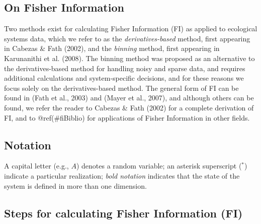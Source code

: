 \documentclass[12pt,twoside,openany]{reedthesis}
\begin{document}
\hypertarget{on-fisher-information}{%
\subsection{On Fisher Information}\label{on-fisher-information}}

Two methods exist for calculating Fisher Information (FI) as applied to ecological systems data, which we refer to as the \emph{derivatives-based} method, first appearing in Cabezas \& Fath (2002), and the \emph{binning} method, first appearing in Karunanithi et al. (2008). The binning method was proposed as an alternative to the derivatives-based method for handling noisy and sparse data, and requires additional calculations and system-specific decisions, and for these reasons we focus solely on the derivatives-based method. The general form of FI can be found in (Fath et al., 2003) and (Mayer et al., 2007), and although others can be found, we refer the reader to Cabezas \& Fath (2002) for a complete derivation of FI, and to @ref(\#fiBiblio) for applications of Fisher Information in other fields.

\hypertarget{notation}{%
\subsection{Notation}\label{notation}}

A capital letter (e.g., \(A\)) denotes a random variable; an asterisk superscript (\(^*\)) indicate a particular realization; \emph{bold notation} indicates that the state of the system is defined in more than one dimension.

\hypertarget{steps-for-calculating-fisher-information-fi}{%
\subsection{Steps for calculating Fisher Information (FI)}\label{steps-for-calculating-fisher-information-fi}}
\end{document}
